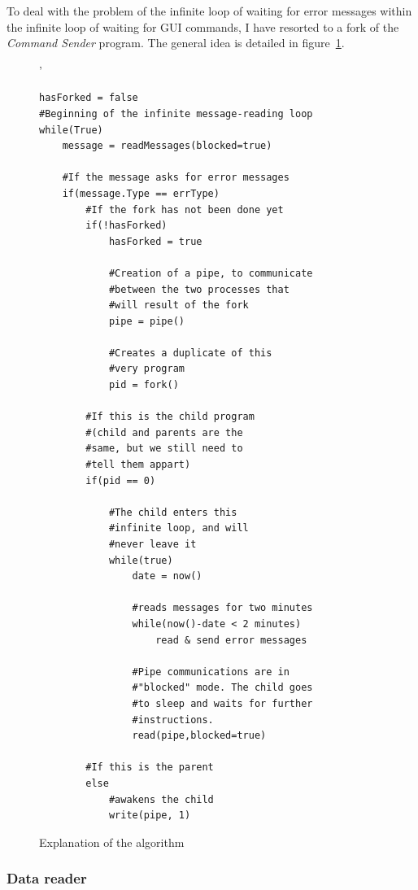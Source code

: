 \documentclass{themeensg}
\begin{document}
To deal with the problem of the infinite loop of waiting for error messages within the infinite loop of waiting for GUI commands, I have resorted to a fork of the \textit{Command Sender} program. The general idea is detailed in figure~\ref{fig:pseudocode}.\\


\begin{figure}[!hb]
	\centering
	\lstset{language=Python}'
 
	\begin{lstlisting}[frame=single]
hasForked = false
#Beginning of the infinite message-reading loop
while(True)	
	message = readMessages(blocked=true)
	
	#If the message asks for error messages
	if(message.Type == errType)
		#If the fork has not been done yet
		if(!hasForked)	
			hasForked = true
			
			#Creation of a pipe, to communicate
			#between the two processes that
			#will result of the fork
			pipe = pipe()
			
			#Creates a duplicate of this
			#very program
			pid = fork()
			
		#If this is the child program
		#(child and parents are the 
		#same, but we still need to
		#tell them appart)
		if(pid == 0)
		
			#The child enters this
			#infinite loop, and will
			#never leave it
			while(true)
				date = now()
				
				#reads messages for two minutes
				while(now()-date < 2 minutes)
					read & send error messages
					
				#Pipe communications are in 
				#"blocked" mode. The child goes
				#to sleep and waits for further
				#instructions.
				read(pipe,blocked=true)
				
		#If this is the parent
		else
			#awakens the child
			write(pipe, 1)				
	\end{lstlisting}
	\caption{Explanation of the algorithm}
	\label{fig:pseudocode}
\end{figure}

\subsubsection{Data reader}
\end{document}
